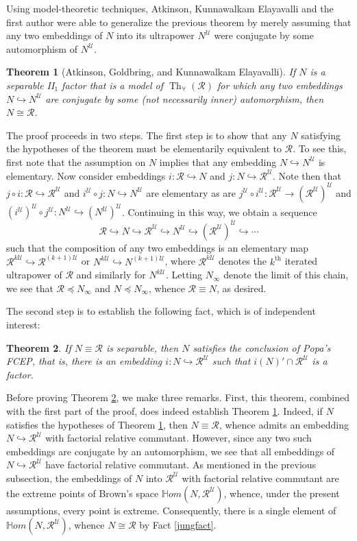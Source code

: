 \documentclass[12pt]{amsart}
\newtheorem{thm}{Theorem}[section]
\theoremstyle{definition}
\def\bb{\mathbb}
\def\bb{\mathbb}
\def\u{\mathsf 1}
\def \Th{\operatorname{Th}}
\def \R{\mathcal R}
\def \u{\mathcal U}
\begin{document}
Using model-theoretic techniques, Atkinson, Kunnawalkam Elayavalli and the first author were able to generalize the previous theorem by merely assuming that any two embeddings of $N$ into its ultrapower $N^\u$ were conjugate by some automorphism of $N^\u$.

\begin{thm}[Atkinson, Goldbring, and Kunnawalkam Elayavalli]\label{AGKtheorem}
If $N$ is a separable II$_1$ factor that is a model of $\Th_\forall(\R)$ for which any two embeddings $N\hookrightarrow N^\u$ are conjugate \emph{by some (not necessarily inner)} automorphism, then $N\cong \R$.
\end{thm}

The proof proceeds in two steps.  The first step is to show that any $N$ satisfying the hypotheses of the theorem must be elementarily equivalent to $\R$.  To see this, first note that the assumption on $N$ implies that any embedding $N\hookrightarrow N^\u$ is elementary. Now consider embeddings $i:\R\hookrightarrow N$ and $j:N\hookrightarrow \R^\u$.  Note then that $j\circ i:\R\hookrightarrow \R^\u$ and $i^\u\circ j:N\hookrightarrow N^\u$ are elementary as are $j^\u\circ i^\u:\R^\u\to (\R^\u)^\u$ and $(i^\u)^\u\circ j^\u:N^\u\hookrightarrow (N^\u)^\u$.  Continuing in this way, we obtain a sequence
$$\R\hookrightarrow N\hookrightarrow \R^\u\hookrightarrow N^\u\hookrightarrow (\R^\u)^\u\hookrightarrow \cdots$$ such that the composition of any two embeddings is an elementary map $\R^{k\u}\hookrightarrow\R^{ (k+1)\u}$ or $N^{k\u}\hookrightarrow N^{(k+1)\u}$, where $\R^{k\u}$ denotes the $k^{\text{th}}$ iterated ultrapower of $\R$ and similarly for $N^{k\u}$.  Letting $N_\infty$ denote the limit of this chain, we see that $\R\preceq N_\infty$ and $N\preceq N_\infty$, whence $\R\equiv N$, as desired.

The second step is to establish the following fact, which is of independent interest:

\begin{thm}\label{eefcep}
If $N\equiv \R$ is separable, then $N$ satisfies the conclusion of Popa's FCEP, that is, there is an embedding $i:N\hookrightarrow \R^\u$ such that $i(N)'\cap \R^\u$ is a factor.
\end{thm}

Before proving Theorem \ref{eefcep}, we make three remarks.  First, this theorem, combined with the first part of the proof, does indeed establish Theorem \ref{AGKtheorem}.  Indeed, if $N$ satisfies the hypotheses of Theorem \ref{AGKtheorem}, then $N\equiv \R$, whence admits an embedding $N\hookrightarrow \R^\u$ with factorial relative commutant.  However, since any two such embeddings are conjugate by an automorphism, we see that all embeddings of $N\hookrightarrow \R^\u$ have factorial relative commutant.  As mentioned in the previous subsection, the embeddings of $N$ into $\R^\u$ with factorial relative commutant are the extreme points of Brown's space $\bb Hom(N,\R^\u)$, whence, under the present assumptions, every point is extreme.  Consequently, there is a single element of $\bb Hom(N,\R^\u)$, whence $N\cong \R$ by Fact \ref{jungfact}.
\end{document}
